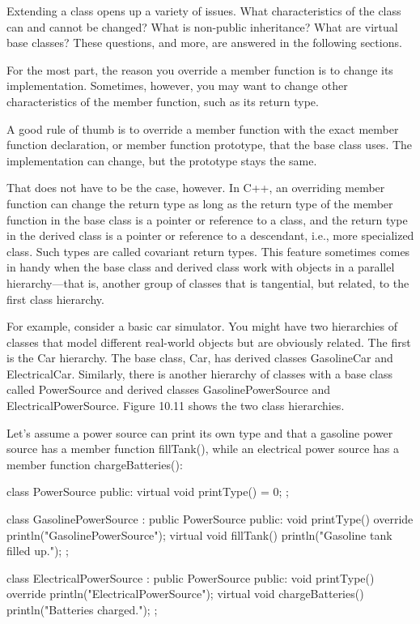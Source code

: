 
Extending a class opens up a variety of issues. What characteristics of the class can and cannot be changed? What is non-public inheritance? What are virtual base classes? These questions, and more, are answered in the following sections.


For the most part, the reason you override a member function is to change its implementation. Sometimes, however, you may want to change other characteristics of the member function, such as its return type.

A good rule of thumb is to override a member function with the exact member function declaration, or member function prototype, that the base class uses. The implementation can change, but the prototype stays the same.

That does not have to be the case, however. In C++, an overriding member function can change the return type as long as the return type of the member function in the base class is a pointer or reference to a class, and the return type in the derived class is a pointer or reference to a descendant, i.e., more specialized class. Such types are called covariant return types. This feature sometimes comes in handy when the base class and derived class work with objects in a parallel hierarchy—that is, another group of classes that is tangential, but related, to the first class hierarchy.

For example, consider a basic car simulator. You might have two hierarchies of classes that model different real-world objects but are obviously related. The first is the Car hierarchy. The base class, Car, has derived classes GasolineCar and ElectricalCar. Similarly, there is another hierarchy of classes with a base class called PowerSource and derived classes GasolinePowerSource and ElectricalPowerSource. Figure 10.11 shows the two class hierarchies.


Let’s assume a power source can print its own type and that a gasoline power source has a member function fillTank(), while an electrical power source has a member function chargeBatteries():

\begin{cpp}
class PowerSource
{
    public:
        virtual void printType() = 0;
};

class GasolinePowerSource : public PowerSource
{
    public:
        void printType() override { println("GasolinePowerSource"); }
        virtual void fillTank() { println("Gasoline tank filled up."); }
};

class ElectricalPowerSource : public PowerSource
{
    public:
        void printType() override { println("ElectricalPowerSource"); }
        virtual void chargeBatteries() { println("Batteries charged."); }
};
\end{cpp}

